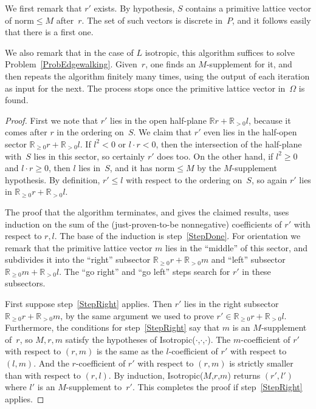 \documentclass[12pt]{amsart}
\def\R{\mathbb{R}}
\numberwithin{theorem}{section}
\numberwithin{equation}{section}
\numberwithin{figure}{section}
\theoremstyle{remark}
\begin{document}
We first remark that $r'$ exists.  By hypothesis, $S$ contains
a primitive lattice vector of norm${}\leq M$ after~$r$. The set
of such vectors is discrete in~$P$, 
and it follows easily that  there is a first one.

We also remark that in the case of $L$ isotropic, this algorithm
suffices to solve Problem~\ref{ProbEdgewalking}.   Given~$r$, one finds
an $M$-supplement for it, and then repeats the algorithm
finitely many times, using the output of each iteration
as input for the next.  The process stops once the primitive lattice vector in~$\Omega$
is found.

\begin{proof}
    First we note that $r'$ lies in the open half-plane $\R r+\R_{>0}l$, because
    it comes after $r$ in the ordering on~$S$.  We claim that  $r'$ even
    lies in the half-open sector $\R_{\geq0}r+\R_{>0}l$.  If
    $l^2<0$ or $l\cdot r<0$, then the intersection of the half-plane with~$S$
    lies in this sector, so certainly $r'$ does too.
    On the other hand, if $l^2\geq0$ and $l\cdot r\geq0$, then $l$ lies in~$S$, and it
    has norm${}\leq M$
    by the $M$-supplement hypothesis.  By definition, $r'\leq l$ with respect to
    the ordering on~$S$,
    so again $r'$ lies in 
    $\R_{\geq0}r+\R_{>0}l$.

    The proof that the algorithm terminates, and gives the
    claimed results, uses induction on the sum of the 
    (just-proven-to-be nonnegative) coefficients of $r'$ with respect to $r,l$.
    The base of the induction is step~\ref{StepDone}.
For orientation  we remark that
the primitive lattice vector
$m$ lies in the ``middle'' of this sector,
    and  subdivides it into the ``right'' subsector 
$\R_{\geq0}r+\R_{>0}m$
and
``left'' subsector $\R_{\geq0}m+\R_{>0}l$.
The  ``go right'' and ``go left'' steps search for $r'$ in these
subsectors.  

First suppose step~\ref{StepRight} applies. Then $r'$ lies in 
    the right subsector $\R_{\geq0}r+\R_{>0}m$, by the same argument we used
    to prove  $r'\in\R_{\geq0}r+\R_{>0}l$.
    Furthermore, 
    the conditions for step~\ref{StepRight} say
    that $m$ is an $M$-supplement
    of~$r$, so $M,r,m$ satisfy the hypotheses of
    {\sf Isotropic($\cdot$,$\cdot$,$\cdot$)}.  
    The $m$-coefficient of $r'$ with respect to $(r,m)$ is the same as the
    $l$-coefficient of $r'$ with respect to $(l,m)$.  And the $r$-coefficient
    of $r'$ with respect to $(r,m)$ is strictly smaller than with respect to $(r,l)$.
    By induction, 
    {\sf Isotropic($M$,$r$,$m$)} returns $(r',l')$ where $l'$ is an $M$-supplement 
    to~$r'$.  This completes the proof if step~\ref{StepRight} applies.


\end{proof}
\end{document}
